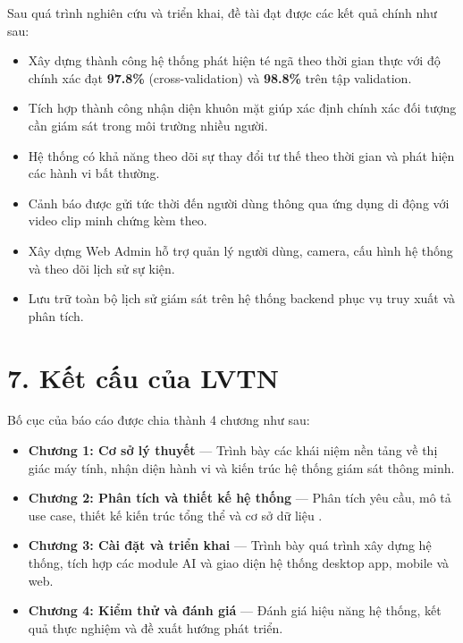 Sau quá trình nghiên cứu và triển khai, đề tài đạt được các kết quả chính như sau:

\begin{itemize}
    \item Xây dựng thành công hệ thống phát hiện té ngã theo thời gian thực với độ chính xác đạt \textbf{97.8\%} (cross-validation) và \textbf{98.8\%} trên tập validation.
    \item Tích hợp thành công nhận diện khuôn mặt giúp xác định chính xác đối tượng cần giám sát trong môi trường nhiều người.
    \item Hệ thống có khả năng theo dõi sự thay đổi tư thế theo thời gian và phát hiện các hành vi bất thường.
    \item Cảnh báo được gửi tức thời đến người dùng thông qua ứng dụng di động với video clip minh chứng kèm theo.
    \item Xây dựng Web Admin hỗ trợ quản lý người dùng, camera, cấu hình hệ thống và theo dõi lịch sử sự kiện.
    \item Lưu trữ toàn bộ lịch sử giám sát trên hệ thống backend phục vụ truy xuất và phân tích.
\end{itemize}

\section*{7. Kết cấu của LVTN}

Bố cục của báo cáo được chia thành 4 chương như sau:

\begin{itemize}
    \item \textbf{Chương 1: Cơ sở lý thuyết} — Trình bày các khái niệm nền tảng về thị giác máy tính, nhận diện hành vi và kiến trúc hệ thống giám sát thông minh.
    \item \textbf{Chương 2: Phân tích và thiết kế hệ thống} — Phân tích yêu cầu, mô tả use case, thiết kế kiến trúc tổng thể và cơ sở dữ liệu .
    \item \textbf{Chương 3: Cài đặt và triển khai} — Trình bày quá trình xây dựng hệ thống, tích hợp các module AI và giao diện hệ thống desktop app, mobile và web.
    \item \textbf{Chương 4: Kiểm thử và đánh giá} — Đánh giá hiệu năng hệ thống, kết quả thực nghiệm và đề xuất hướng phát triển.
\end{itemize}